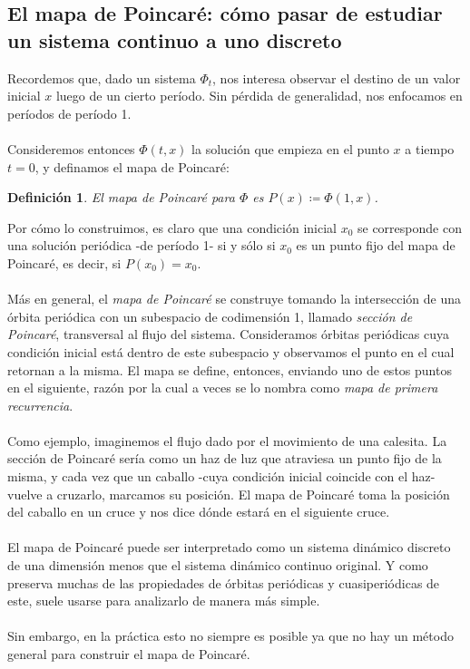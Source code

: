 \documentclass[12pt,a4paper]{article}
\newtheorem{definition}[theorem]{Definición}
\begin{document}
\subsection{El mapa de Poincaré: cómo pasar de estudiar un sistema continuo a uno discreto}
Recordemos que, dado un sistema $\Phi_t$, nos interesa observar el destino de un valor inicial $x$ luego de un cierto período. Sin pérdida de generalidad, nos enfocamos en períodos de período 1.
\\
\\
Consideremos entonces $\Phi(t,x)$ la solución que empieza en el punto $x$ a tiempo $t=0$, y definamos el mapa de Poincaré: 
\begin{definition}
    El mapa de Poincaré para $\Phi$ es $P(x) \coloneqq \Phi(1,x)$.
\end{definition}
Por cómo lo construimos, es claro que una condición inicial $x_0$ se corresponde con una solución periódica -de período 1- si y sólo si $x_0$ es un punto fijo del mapa de Poincaré, es decir, si $P(x_0) = x_0$.
\\
\\
Más en general, el \textit{mapa de Poincaré} se construye tomando la intersección de una órbita periódica con un subespacio de codimensión 1, llamado \textit{sección de Poincaré}, transversal al flujo del sistema. Consideramos órbitas periódicas cuya condición inicial está dentro de este subespacio y observamos el punto en el cual retornan a la misma. El mapa se define, entonces, enviando uno de estos puntos en el siguiente, razón por
la cual a veces se lo nombra como \textit{mapa de primera recurrencia}.
\\
\\
Como ejemplo, imaginemos el flujo dado por el movimiento de una calesita. La sección de Poincaré sería como un haz de luz que atraviesa un punto fijo de la misma, y cada vez que un caballo -cuya condición inicial coincide con el haz- vuelve a cruzarlo, marcamos su posición. El mapa de Poincaré toma la posición del caballo en un cruce y nos dice dónde estará en el siguiente cruce.
\\
\\
El mapa de Poincaré puede ser interpretado como un sistema dinámico discreto de una dimensión menos que el sistema dinámico continuo original. Y como preserva muchas de las propiedades de órbitas periódicas y cuasiperiódicas de este, suele usarse para analizarlo de manera más simple.
\\
\\
Sin embargo, en la práctica esto no siempre es posible ya que no hay un método general para construir el mapa de Poincaré.
\end{document}
